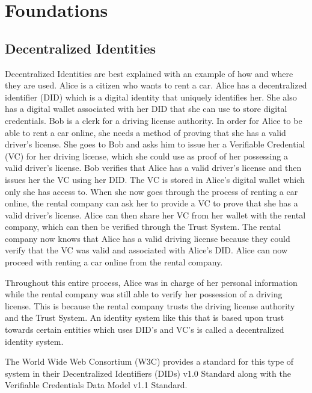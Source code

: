 \chapter{Foundations}
\label{cha:foundations}


\section{Decentralized Identities}

Decentralized Identities are best explained with an example of how and where they are used.
\Gls{Alice} is a citizen who wants to rent a car. \Gls{Alice} has a decentralized identifier (DID) which is a digital identity
that uniquely identifies her. She also has a digital wallet associated with her DID that she can use
to store digital credentials. \Gls{Bob} is a clerk for a driving license authority.
In order for \Gls{Alice} to be able to rent a car online, she needs a method of proving that she has a valid
driver's license. She goes to \Gls{Bob} and asks him to issue her a Verifiable Credential (VC) for her driving
license, which she could use as proof of her possessing a valid driver's license.
\Gls{Bob} verifies that \Gls{Alice} has a valid driver's license and then issues her the VC using her DID.
The VC is stored in Alice's digital wallet which only she has access to.
When she now goes through the process of renting a car online, the rental company
can ask her to provide a VC to prove that she has a valid driver's license.
\Gls{Alice} can then share her VC from her wallet with the rental company, which can then be
verified through the Trust System. The rental company now knows that \Gls{Alice} has a valid driving license
because they could verify that the VC was valid and associated with Alice's DID.
\Gls{Alice} can now proceed with renting a car online from the rental company.

Throughout this entire process, \Gls{Alice} was in charge of her personal information while
the rental company was still able to verify her possession of a driving license. This is because
the rental company trusts the driving license authority and the Trust System.
An identity system like this that is based upon trust towards certain entities which uses DID's and VC's is called
a decentralized identity system.

The World Wide Web Consortium (W3C) provides a standard for this type of system in their Decentralized Identifiers (DIDs) v1.0
Standard along with the Verifiable Credentials Data Model v1.1 Standard.


